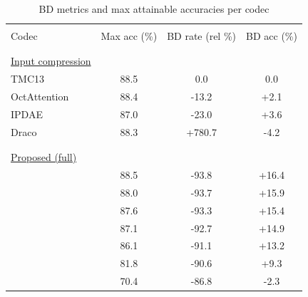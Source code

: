 \begin{table}[t]
  \centering
  \begin{threeparttable}
  \caption{BD metrics and max attainable accuracies per codec}
  \label{tbl:measurements}
  \scriptsize
  \newcommand{\tablesubheaderstyle}[1]{{\underline{#1}}}
  \newcommand{\tbleq}[1]{{\normalsize \scalebox{0.7}{{#1}}}}
  \setlength{\tablesepskip}{-0.8\normalbaselineskip}
  \setlength{\tablesubheaderskip}{0.6\normalbaselineskip}
  \begin{tabular}[]{lccc}
    \toprule
    \\[\tablesepskip]
    Codec                   & Max acc (\%) & BD rate (rel \%) & BD acc (\%)
    \\
    \\[\tablesepskip]
    \midrule
    \\[\tablesepskip]
    \tablesubheaderstyle{Input compression} \\[\tablesubheaderskip]
    TMC13~\cite{mpeg2021tmc13}                  &   88.5 &    0.0 &    0.0 \\
    OctAttention~\cite{fu2022octattention}      &   88.4 &  -13.2 &   +2.1 \\
    IPDAE~\cite{you2022ipdae}                   &   87.0 &  -23.0 &   +3.6 \\
    Draco~\cite{google2017draco}                &   88.3 & +780.7 &   -4.2 \\
    \\[\tablesepskip]
    \midrule
    \\[\tablesepskip]
    \tablesubheaderstyle{Proposed (full)} \\[\tablesubheaderskip]
    \tbleq{$P=1024$}        &   88.5 &  -93.8 &  +16.4 \\
    \tbleq{$P=512$}         &   88.0 &  -93.7 &  +15.9 \\
    \tbleq{$P=256$}         &   87.6 &  -93.3 &  +15.4 \\
    \tbleq{$P=128$}         &   87.1 &  -92.7 &  +14.9 \\
    \tbleq{$P=64$}          &   86.1 &  -91.1 &  +13.2 \\
    \tbleq{$P=32$}          &   81.8 &  -90.6 &   +9.3 \\
    \tbleq{$P=16$}          &   70.4 &  -86.8 &   -2.3 \\

\end{tabular}
\end{threeparttable}
\end{table}
